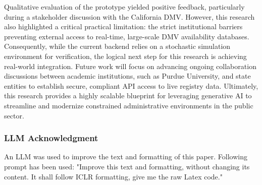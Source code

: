 \documentclass{article} %
\begin{document}
Qualitative evaluation of the prototype yielded positive feedback, particularly during a stakeholder discussion with the California DMV. However, this research also highlighted a critical practical limitation: the strict institutional barriers preventing external access to real-time, large-scale DMV availability databases. Consequently, while the current backend relies on a stochastic simulation environment for verification, the logical next step for this research is achieving real-world integration. Future work will focus on advancing ongoing collaboration discussions between academic institutions, such as Purdue University, and state entities to establish secure, compliant API access to live registry data. Ultimately, this research provides a highly scalable blueprint for leveraging generative AI to streamline and modernize constrained administrative environments in the public sector.



\subsubsection*{LLM Acknowledgment}
An LLM was used to improve the text and formatting of this paper. Following prompt has been used: "Improve this text and formatting, without changing its content. It shall follow ICLR formatting, give me the raw Latex code."




\end{document}
